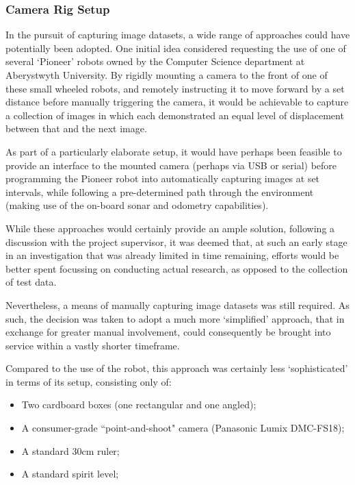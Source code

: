 \subsubsection{Camera Rig Setup}

In the pursuit of capturing image datasets, a wide range of approaches could have potentially been adopted. One initial idea considered requesting the use of one of several `Pioneer' robots owned by the Computer Science department at Aberystwyth University. By rigidly mounting a camera to the front of one of these small wheeled robots, and remotely instructing it to move forward by a set distance before manually triggering the camera, it would be achievable to capture a collection of images in which each demonstrated an equal level of displacement between that and the next image. 

As part of a particularly elaborate setup, it would have perhaps been feasible to provide an interface to the mounted camera (perhaps via USB or serial) before programming the Pioneer robot into automatically capturing images at set intervals, while following a pre-determined path through the environment (making use of the on-board sonar and odometry capabilities). 

While these approaches would certainly provide an ample solution, following a discussion with the project supervisor, it was deemed that, at such an early stage in an investigation that was already limited in time remaining, efforts would be better spent focussing on conducting actual research, as opposed to the collection of test data.

Nevertheless, a means of manually capturing image datasets was still required. As such, the decision was taken to adopt a much more `simplified' approach, that in exchange for greater manual involvement, could consequently be brought into service within a vastly shorter timeframe. 

Compared to the use of the robot, this approach was certainly less `sophisticated' in terms of its setup, consisting only of:

\begin{itemize}
	\item Two cardboard boxes (one rectangular and one angled);
	\item A consumer-grade ``point-and-shoot" camera (Panasonic Lumix DMC-FS18);
	\item A standard 30cm ruler;
	\item A standard spirit level;
\end{itemize}

